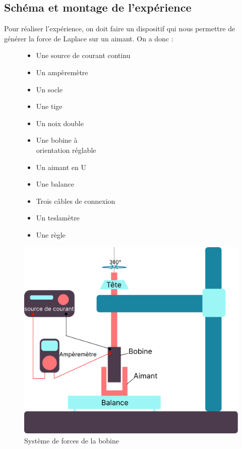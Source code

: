 \documentclass[12pt,a4paper]{article}
\begin{document}
    \subsection{Schéma et montage de l’expérience}
    Pour réaliser l'expérience, on doit faire un dispositif qui nous permettre de générer la force de Laplace sur un aimant. On a donc : 
    \begin{figure}[H]
        \begin{minipage}{0.45\linewidth} %
            \begin{itemize}
                \item Une source de courant continu
                \item Un ampèremètre
                \item Un socle
                \item Une tige
                \item Un noix double
                \item Une bobine à \\
                    orientation réglable
                \item Un aimant en U
                \item Une balance
                \item Trois câbles de connexion
                \item Un teslamètre
                \item Une règle
            \end{itemize}
        \end{minipage}%
        \hfill
        \begin{minipage}{0.5\linewidth} %
            \centering
            \includegraphics[scale=0.35]{images/experiment_layout.pdf}
            \caption{Système de forces de la bobine}
        \end{minipage}
    \end{figure}
\end{document}
